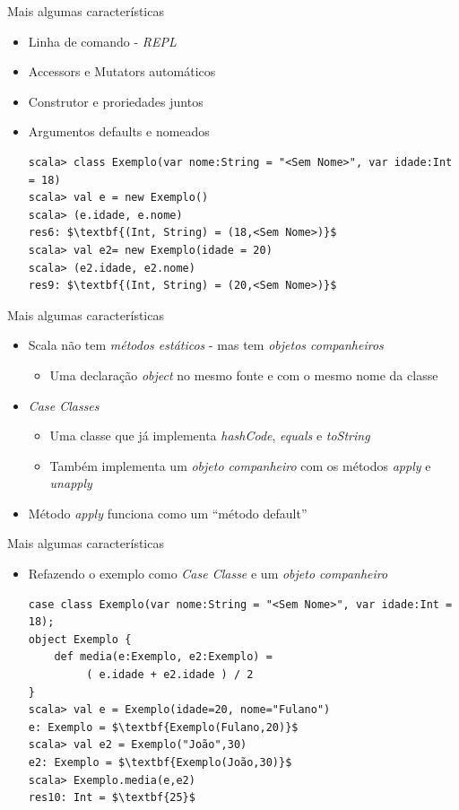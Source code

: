 \documentclass{beamer}
\begin{document}
\begin{frame}[fragile]{Mais algumas características} 
    \begin{itemize} %
        \item Linha de comando - \emph{REPL}
        \item Accessors e Mutators automáticos
        \item Construtor e proriedades juntos
        \item Argumentos defaults e nomeados        
\begin{lstlisting}
scala> class Exemplo(var nome:String = "<Sem Nome>", var idade:Int = 18)
scala> val e = new Exemplo()
scala> (e.idade, e.nome)
res6: $\textbf{(Int, String) = (18,<Sem Nome>)}$
scala> val e2= new Exemplo(idade = 20)
scala> (e2.idade, e2.nome)
res9: $\textbf{(Int, String) = (20,<Sem Nome>)}$
\end{lstlisting}
    \end{itemize}
\end{frame}

\begin{frame}[fragile]{Mais algumas características} 
    \begin{itemize} %
        \item Scala não tem \emph{métodos estáticos} - mas tem \emph{objetos companheiros}
        \begin{itemize}
	\item Uma declaração \emph{object} no mesmo fonte e com o mesmo nome da classe
        \end{itemize}
        \item \emph{Case Classes}
        \begin{itemize}
              \item Uma classe que já implementa \emph{hashCode}, \emph{equals} e \emph{toString}
	   \item Também implementa um \emph{objeto companheiro} com os métodos \emph{apply} e \emph{unapply}
        \end{itemize}
        \item Método \emph{apply} funciona como um ``método default''
    \end{itemize}
\end{frame}

\begin{frame}[fragile]{Mais algumas características} 
    \begin{itemize} %
        \item Refazendo o exemplo como \emph{Case Classe}  e um \emph{objeto companheiro}
\begin{lstlisting}
case class Exemplo(var nome:String = "<Sem Nome>", var idade:Int = 18); 
object Exemplo {
	def media(e:Exemplo, e2:Exemplo) =
		 ( e.idade + e2.idade ) / 2
}
scala> val e = Exemplo(idade=20, nome="Fulano")
e: Exemplo = $\textbf{Exemplo(Fulano,20)}$
scala> val e2 = Exemplo("João",30)
e2: Exemplo = $\textbf{Exemplo(João,30)}$
scala> Exemplo.media(e,e2)
res10: Int = $\textbf{25}$
\end{lstlisting}
    \end{itemize}
\end{frame}
\end{document}
